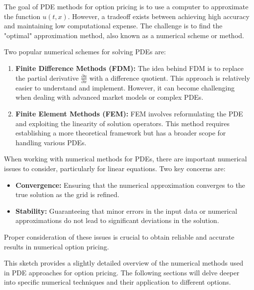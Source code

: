 The goal of PDE methods for option pricing is to use a computer to approximate the function $u(t, x)$. However, a tradeoff exists between achieving high accuracy and maintaining low computational expense. The challenge is to find the "optimal" approximation method, also known as a numerical scheme or method.

Two popular numerical schemes for solving PDEs are:
\begin{enumerate}
    \item \textbf{Finite Difference Methods (FDM):} The idea behind FDM is to replace the partial derivative $\frac{\partial u}{\partial x}$ with a difference quotient. This approach is relatively easier to understand and implement. However, it can become challenging when dealing with advanced market models or complex PDEs.
    
    \item \textbf{Finite Element Methods (FEM):} FEM involves reformulating the PDE and exploiting the linearity of solution operators. This method requires establishing a more theoretical framework but has a broader scope for handling various PDEs.
\end{enumerate}

When working with numerical methods for PDEs, there are important numerical issues to consider, particularly for linear equations. Two key concerns are:
\begin{itemize}
    \item \textbf{Convergence:} Ensuring that the numerical approximation converges to the true solution as the grid is refined.
    
    \item \textbf{Stability:} Guaranteeing that minor errors in the input data or numerical approximations do not lead to significant deviations in the solution.
\end{itemize}

Proper consideration of these issues is crucial to obtain reliable and accurate results in numerical option pricing.

This sketch provides a slightly detailed overview of the numerical methods used in PDE approaches for option pricing. The following sections will delve deeper into specific numerical techniques and their application to different options.

